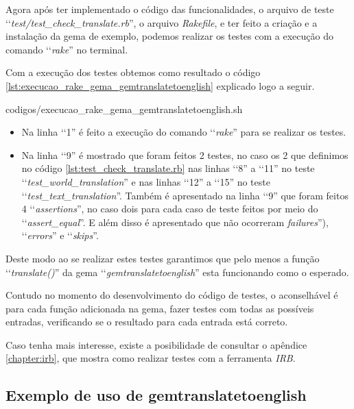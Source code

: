 Agora após ter implementado o código das funcionalidades, o arquivo de teste 
‘‘\emph{test/test\_check\_translate.rb}'', o arquivo \emph{Rakefile}, e ter feito a criação e a instalação 
da gema de exemplo, podemos realizar os testes com a execução do comando ‘‘\emph{rake}'' no terminal. 

Com a execução dos testes obtemos como resultado o código \ref{lst:execucao_rake_gema_gemtranslatetoenglish}
explicado logo a seguir.


{codigos/execucao_rake_gema_gemtranslatetoenglish.sh }

\begin{itemize}

 \item Na linha ‘‘1'' é feito a execução do comando ‘‘\emph{rake}'' para se realizar os testes.
 
 \item Na linha ‘‘9'' é mostrado que foram feitos 2 testes, no caso os 2 que definimos no código 
 \ref{lst:test_check_translate.rb} nas linhas ‘‘8'' a ‘‘11'' no teste ‘‘\emph{test\_world\_translation}''
 e nas linhas ‘‘12'' a ‘‘15'' no teste ‘‘\emph{test\_text\_translation}''. Também é apresentado na
 linha ‘‘9'' que foram feitos 4 ‘‘\emph{assertions}'', no caso dois para cada caso de teste feitos por
 meio do ‘‘\emph{assert\_equal}''. E além disso é apresentado que não ocorreram  \emph{failures}''),
 ‘‘\emph{errors}'' e ‘‘\emph{skips}''.
 
\end{itemize}

Deste modo ao se realizar estes testes garantimos que pelo menos a função ‘‘\emph{translate()}'' da gema
‘‘\emph{gemtranslatetoenglish}'' esta funcionando como o esperado.

Contudo no momento do desenvolvimento do código de testes, o aconselhável é para cada função adicionada 
na gema, fazer testes com todas as possíveis entradas, verificando se o resultado para cada entrada 
está correto.

Caso tenha mais interesse, existe a posibilidade de consultar o apêndice \ref{chapter:irb}, que mostra
como realizar testes com a ferramenta \emph{IRB}.

\subsection{Exemplo de uso de gemtranslatetoenglish}
\label{subsection:exemplo_de_uso_de_gemtranslatetoenglish}

